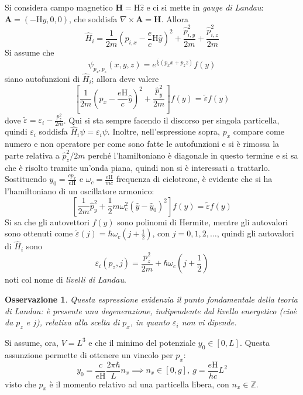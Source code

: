 \documentclass[11pt, a4paper]{scrartcl}
\theoremstyle{style}
\newtheorem{osservazione}{Osservazione}[section]
\theoremstyle{style1}
\numberwithin{equation}{subsection}
\begin{document}
Si considera campo magnetico $\mathbf{H}  = \mathrm{H} \hat{z}$ e ci si mette in \textit{gauge di Landau}: $\mathbf{A}  = (- \mathrm{H} y ,0,0)$, che soddisfa $\nabla \times \mathbf{A}  = \mathbf{H} $.
Allora 
\[
\hat{H}_i = \frac{1}{2m} \left(\hat{p}_{i,x} - \frac{e}{c} \mathrm{H} \hat{y} \right) ^2 + \frac{\hat{p}_{i,y} ^2}{2m} + \frac{\hat{p}_{i,z}^2 }{2m}
\] 
Si assume che 
\[
\psi _{p_x,p_z}  (x,y,z) = e^{\frac{i}{\hbar }\left(p_x x + p_z z\right) } f(y)
\] 
siano autofunzioni di $\hat{H}_i$; allora deve valere
\[
\left[ \frac{1}{2m} \left(p_x - \frac{e\mathrm{H} }{c}\hat{y}\right) ^2 + \frac{\hat{p}_y^2}{2m} \right] f(y) = \tilde{\varepsilon } f(y)
\] 
dove $\tilde{\varepsilon } = \varepsilon_i - \frac{p_z^2}{2m}$.
Qui si sta sempre facendo il discorso per singola particella, quindi $\varepsilon _i$ soddisfa $\hat{H}_i\psi = \varepsilon _i\psi$.
Inoltre, nell'espressione sopra, $p_x$ compare come numero e non operatore per come sono fatte le autofunzioni e si \`e rimossa la parte relativa a $\hat{p}_z^2/2m$ perch\'e l'hamiltoniano \`e diagonale in questo termine e si sa che \`e risolto tramite un'onda piana, quindi non si \`e interessati a trattarlo.
Sostituendo $y_0 = \frac{cp_x}{ e \mathrm{H} }$ e $\omega _c = \frac{e\mathrm{H} }{mc}$ frequenza di ciclotrone, \`e evidente che si ha l'hamiltoniano di un oscillatore armonico:
\[
\left[ \frac{1}{2m} \hat{p}_y^2 + \frac{1}{2} m \omega_c^2 \left(\hat{y}- \hat{y}_0\right) ^2 \right] f(y) = \tilde{\varepsilon }f(y)
\] 
Si sa che gli autovettori $f(y)$ sono polinomi di Hermite, mentre gli autovalori sono ottenuti come $\tilde{\varepsilon }(j) = \hbar \omega_c \left(j + \frac{1}{2}\right) $, con $j=0,1,2,\ldots$, quindi gli autovalori di $\hat{H}_i$ sono
\[
\varepsilon _i (p_z,j) = \frac{p_z^2}{2m} + \hbar \omega_c \left(j + \frac{1}{2}\right) 
\] 
noti col nome di \textit{livelli di Landau}.
\begin{osservazione}
Questa espressione evidenzia il punto fondamentale della teoria di Landau: \`e presente una degenerazione, indipendente dal livello energetico (cio\`e da $p_z$ e $j$), relativa alla scelta di $p_x$, in quanto $\varepsilon_i $ non vi dipende.
\end{osservazione}
\noindent Si assume, ora, $V= L^3$ e che il minimo del potenziale $y_0 \in \left[ 0,L \right] $.
Questa assunzione permette di ottenere un vincolo per $p_x$:
\[
y_0 = \frac{c}{e\mathrm{H} } \frac{2\pi \hbar }{L}n_x \implies n_x \in \left[ 0,g \right], \ g = \frac{e\mathrm{H} }{hc}L^2
\] 
visto che $p_x$ \`e il momento relativo ad una particella libera, con $n_x \in \mathbb{Z}$.
\end{document}
